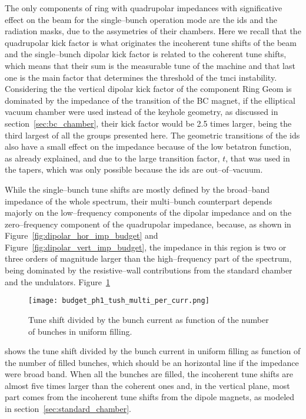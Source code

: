     The only components of ring with quadrupolar impedances with significative effect on the beam for the single--bunch operation mode are the \glspl{id} and the radiation masks, due to the assymetries of their chambers. Here we recall that the quadrupolar kick factor is what originates the incoherent tune shifts of the beam and the single--bunch dipolar kick factor is related to the coherent tune  shifts, which means that their sum is the measurable tune of the machine and that last one is the main factor that determines the threshold of the \gls{tmci} instability. Considering the the vertical dipolar kick factor of the component Ring Geom is dominated by the impedance of the transition of the BC magnet, if the elliptical vacuum chamber were used instead of the keyhole geometry, as discussed in section~\ref{sec:bc_chamber}, their kick factor would be \num{2.5} times larger, being the third largest of all the groups presented here. The geometric transitions of the \glspl{id} also have a small effect on the impedance because of the low betatron function, as already explained, and due to the large transition factor, $t$, that was used in the tapers, which was only possible because the \glspl{id} are out--of--vacuum.

    While the single--bunch tune shifts are mostly defined by the broad--band impedance of the whole spectrum, their multi--bunch counterpart depends majorly on the low--frequency components of the dipolar impedance and on the zero--frequency component of the quadrupolar impedance, because, as shown in Figure~\ref{fig:dipolar_hor_imp_budget} and Figure~\ref{fig:dipolar_vert_imp_budget}, the impedance in this region is two or three orders of magnitude larger than the high--frequency part of the spectrum, being dominated by the resistive--wall contributions from the standard chamber and the undulators.
    Figure~\ref{fig:ph1_tush_multi_per_curr}
    \begin{figure}
        \centering
        \texttt{[image: budget\_ph1\_tush\_multi\_per\_curr.png]}
        \caption{Tune shift divided by the bunch current as function of the number of bunches in uniform filling.}
        \label{fig:ph1_tush_multi_per_curr}
    \end{figure}
    shows the tune shift divided by the bunch current in uniform filling as function of the number of filled bunches, which should be an horizontal line if the impedance were broad band. When all the bunches are filled, the incoherent tune shifts are almost five times larger than the coherent ones and, in the vertical plane, most part comes from the  incoherent tune shifts from the dipole magnets, as modeled in section~\ref{sec:standard_chamber}.


